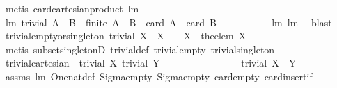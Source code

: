 \begin{isabellebody}
\ {\isacharparenleft}metis\ card{\isacharunderscore}cartesian{\isacharunderscore}product\ lm{}{}{\isacharparenright}%
\endisatagproof
{\isafoldproof}%
%
\isadelimproof
\isanewline
%
\endisadelimproof
\isanewline
{}\isamarkupfalse%
\ lm{}{}{\isacharcolon}\ {\isachardoublequoteopen}trivial\ {\isacharparenleft}A\ {\isasymtimes}\ B{\isacharparenright}\ {\isacharequal}\ {\isacharparenleft}finite\ {\isacharparenleft}A\ {\isasymtimes}\ B{\isacharparenright}\ {\isacharampersand}\ card\ A\ {\isacharasterisk}\ {\isacharparenleft}card\ B{\isacharparenright}\ {\isasymle}\ {}{\isacharparenright}{\isachardoublequoteclose}\ \isanewline
%
\isadelimproof
\ \ \ \ \ \ %
\endisadelimproof
%
\isatagproof
{}\isamarkupfalse%
\ lm{}{}\ lm{}{}\ \isamarkupfalse%
\ blast%
\endisatagproof
{\isafoldproof}%
%
\isadelimproof
\isanewline
%
\endisadelimproof
\isanewline
{}\isamarkupfalse%
\ trivial{\isacharunderscore}empty{\isacharunderscore}or{\isacharunderscore}singleton{\isacharcolon}\ {\isachardoublequoteopen}trivial\ X\ {\isacharequal}\ {\isacharparenleft}X\ {\isacharequal}\ {\isacharbraceleft}{\isacharbraceright}\ {\isasymor}\ X\ {\isacharequal}\ {\isacharbraceleft}the{\isacharunderscore}elem\ X{\isacharbraceright}{\isacharparenright}{\isachardoublequoteclose}\ \isanewline
%
\isadelimproof
\ \ \ \ \ \ %
\endisadelimproof
%
\isatagproof
{}\isamarkupfalse%
\ {\isacharparenleft}metis\ subset{\isacharunderscore}singletonD\ trivial{\isacharunderscore}def\ trivial{\isacharunderscore}empty\ trivial{\isacharunderscore}singleton{\isacharparenright}%
\endisatagproof
{\isafoldproof}%
%
\isadelimproof
\isanewline
%
\endisadelimproof
\isanewline
{}\isamarkupfalse%
\ trivial{\isacharunderscore}cartesian{\isacharcolon}\ \ {\isachardoublequoteopen}trivial\ X{\isachardoublequoteclose}\ {\isachardoublequoteopen}trivial\ Y{\isachardoublequoteclose}\ \isanewline
\ \ \ \ \ \ \ \ \ \ \ \ \ \ \ {\isachardoublequoteopen}trivial\ {\isacharparenleft}X\ {\isasymtimes}\ Y{\isacharparenright}{\isachardoublequoteclose}\isanewline
%
\isadelimproof
\ \ \ \ \ \ %
\endisadelimproof
%
\isatagproof
{}\isamarkupfalse%
\ assms\ lm{}{}\ One{\isacharunderscore}nat{\isacharunderscore}def\ Sigma{\isacharunderscore}empty{}\ Sigma{\isacharunderscore}empty{}\ card{\isacharunderscore}empty\ card{\isacharunderscore}insert{\isacharunderscore}if\isanewline

\end{isabellebody}
